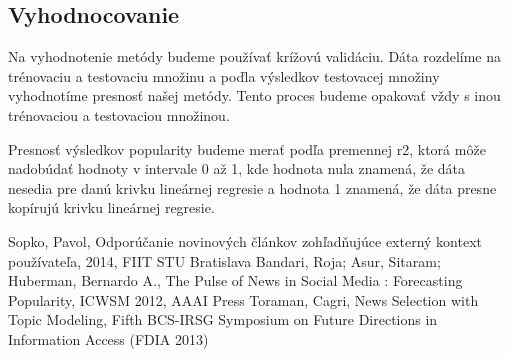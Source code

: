 \documentclass[runningheads,a4paper]{llncs}
\begin{document}
\subsection{Vyhodnocovanie}
Na vyhodnotenie metódy budeme používať krížovú validáciu. Dáta rozdelíme na trénovaciu a testovaciu množinu a poďla výsledkov testovacej množiny vyhodnotíme presnosť našej metódy. Tento proces budeme opakovať vždy s inou trénovaciou a testovaciou množinou. 

Presnosť výsledkov popularity budeme merať podľa premennej r2, ktorá môže nadobúdať hodnoty v intervale 0 až 1, kde hodnota nula znamená, že dáta nesedia pre danú krivku lineárnej regresie a hodnota 1 znamená, že dáta presne kopírujú krivku lineárnej regresie.

\begin{thebibliography}{widest entry}
   Sopko, Pavol, Odporúčanie novinových článkov zohľadňujúce externý kontext používateľa, 2014, FIIT STU Bratislava
   Bandari, Roja; Asur, Sitaram; Huberman, Bernardo A., The Pulse of News in Social Media : Forecasting Popularity, ICWSM 2012, AAAI Press
   Toraman, Cagri, News Selection with Topic Modeling, Fifth BCS-IRSG Symposium on Future Directions in Information Access (FDIA 2013)
\end{thebibliography}
\end{document}
